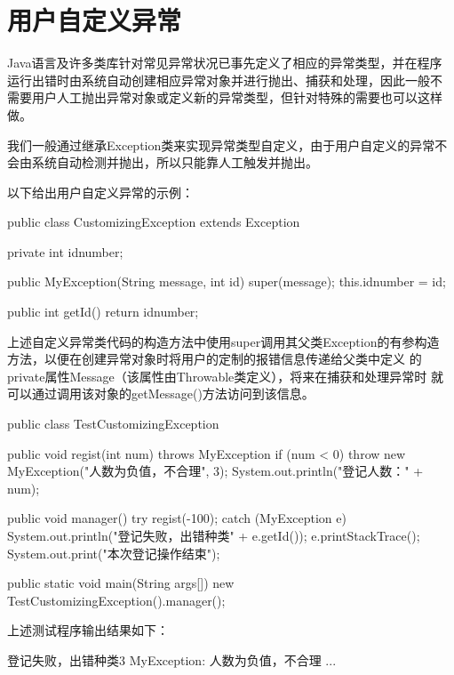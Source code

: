 \section{用户自定义异常}

Java语言及许多类库针对常见异常状况已事先定义了相应的异常类型，并在程序
运行出错时由系统自动创建相应异常对象并进行抛出、捕获和处理，因此一般不
需要用户人工抛出异常对象或定义新的异常类型，但针对特殊的需要也可以这样
做。

我们一般通过继承Exception类来实现异常类型自定义，由于用户自定义的异常不
会由系统自动检测并抛出，所以只能靠人工触发并抛出。

以下给出用户自定义异常的示例：


\begin{javaCode}
public class CustomizingException extends Exception {
  private int idnumber;

  public MyException(String message, int id) {
    super(message);
    this.idnumber = id;
  }

  public int getId() {
    return idnumber;
  }
}
\end{javaCode} 

上述自定义异常类代码的构造方法中使用super调用其父类Exception的有参构造
方法，以便在创建异常对象时将用户的定制的报错信息传递给父类中定义
的private属性Message（该属性由Throwable类定义），将来在捕获和处理异常时
就可以通过调用该对象的getMessage()方法访问到该信息。


\begin{javaCode}
public class TestCustomizingException {
  public void regist(int num) throws MyException {
    if (num < 0) {
      throw new MyException("人数为负值，不合理", 3);
    }
    System.out.println("登记人数：" + num);
  }

  public void manager() {
    try {
      regist(-100);
    } catch (MyException e) {
      System.out.println("登记失败，出错种类" + e.getId());
      e.printStackTrace();
    }
    System.out.print("本次登记操作结束");
  }

  public static void main(String args[]) {
    new TestCustomizingException().manager();
  }
}
\end{javaCode}

上述测试程序输出结果如下：

\begin{stdoutCode}
登记失败，出错种类3
MyException: 人数为负值，不合理 ...
\end{stdoutCode}

